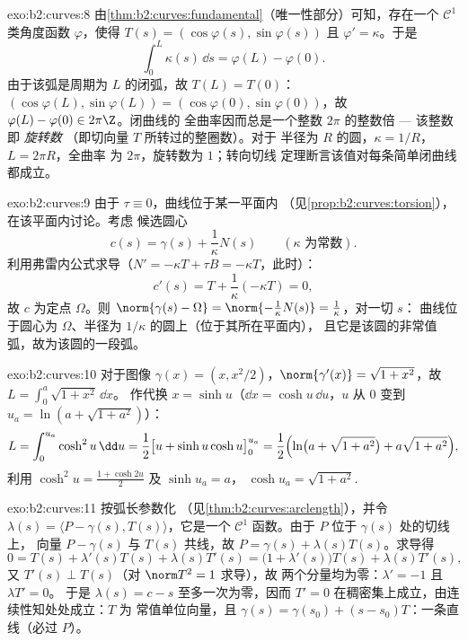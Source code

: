 \begin{solution}{exo:b2:curves:8}
由\cref{thm:b2:curves:fundamental}（唯一性部分）可知，存在一个
$\mathcal{C}^1$ 类角度函数 $\varphi$，使得 $T(s) =
(\cos\varphi(s), \sin\varphi(s))$ 且 $\varphi' = \kappa$。于是
\[
\int_0^L \kappa(s)\,\dd s = \varphi(L) - \varphi(0) .
\]
由于该弧是周期为 $L$ 的闭弧，故 $T(L) = T(0)$：
$(\cos\varphi(L), \sin\varphi(L)) = (\cos\varphi(0),
\sin\varphi(0))$，故 $\varphi(L) - \varphi(0) \in 2\pi\Z$。闭曲线的
全曲率因而总是一个整数
$2\pi$ 的整数倍 --- 该整数即 \emph{旋转数}
（即切向量 $T$ 所转过的整圈数）。对于
半径为 $R$ 的圆，$\kappa = 1/R$，$L = 2\pi R$，全曲率
为 $2\pi$，旋转数为 $1$；转向切线
定理断言该值对每条简单闭曲线都成立。
\end{solution}

\begin{solution}{exo:b2:curves:9}
由于 $\tau \equiv 0$，曲线位于某一平面内
（见\cref{prop:b2:curves:torsion}），在该平面内讨论。考虑
候选圆心
\[
c(s) = \gamma(s) + \frac{1}{\kappa}N(s)
\qquad (\kappa \text{ 为常数}).
\]
利用弗雷内公式求导（$N' = -\kappa T + \tau B
= -\kappa T$，此时）：
\[
c'(s) = T + \frac1\kappa(-\kappa T) = 0 ,
\]
故 $c$ 为定点 $\Omega$。则 $\norm{\gamma(s) -
\Omega} = \norm{-\frac1\kappa N(s)} = \frac1\kappa$，对一切 $s$：
曲线位于圆心为 $\Omega$、半径为
$1/\kappa$ 的圆上（位于其所在平面内），
且它是该圆的非常值弧，故为该圆的一段弧。
\end{solution}

\begin{solution}{exo:b2:curves:10}
对于图像 $\gamma(x) = (x, x^2/2)$，$\norm{\gamma'(x)} =
\sqrt{1 + x^2}$，故 $L = \int_0^a\sqrt{1+x^2}\,\dd x$。
作代换 $x = \sinh u$（$\dd x = \cosh u\,\dd u$，$u$ 从
$0$ 变到 $u_a = \ln(a + \sqrt{1+a^2})$）：
\[
L = \int_0^{u_a}\cosh^2 u\,\dd u
= \frac12\bigl[u + \sinh u\cosh u\bigr]_0^{u_a}
= \frac12\Bigl(\ln\bigl(a + \sqrt{1+a^2}\bigr) +
a\sqrt{1+a^2}\Bigr),
\]
利用 $\cosh^2 u = \frac{1 + \cosh 2u}2$ 及 $\sinh u_a = a$，
$\cosh u_a = \sqrt{1 + a^2}$.
\end{solution}

\begin{solution}{exo:b2:curves:11}
按弧长参数化
（见\cref{thm:b2:curves:arclength}），并令 $\lambda(s) =
\langle P - \gamma(s), T(s)\rangle$，它是一个 $\mathcal C^1$
函数。由于 $P$ 位于 $\gamma(s)$ 处的切线上，
向量 $P - \gamma(s)$ 与 $T(s)$ 共线，故 $P =
\gamma(s) + \lambda(s)T(s)$。求导得
\[
0 = T(s) + \lambda'(s)T(s) + \lambda(s)T'(s)
= \bigl(1 + \lambda'(s)\bigr)T(s) + \lambda(s)T'(s),
\]
又 $T'(s) \perp T(s)$（对 $\norm T^2 = 1$ 求导），故
两个分量均为零：$\lambda' = -1$ 且 $\lambda T' = 0$。
于是 $\lambda(s) = c - s$ 至多一次为零，因而 $T' = 0$
在稠密集上成立，由连续性知处处成立：$T$ 为
常值单位向量，且 $\gamma(s) = \gamma(s_0) + (s -
s_0)T$：一条直线（必过 $P$）。
\end{solution}

